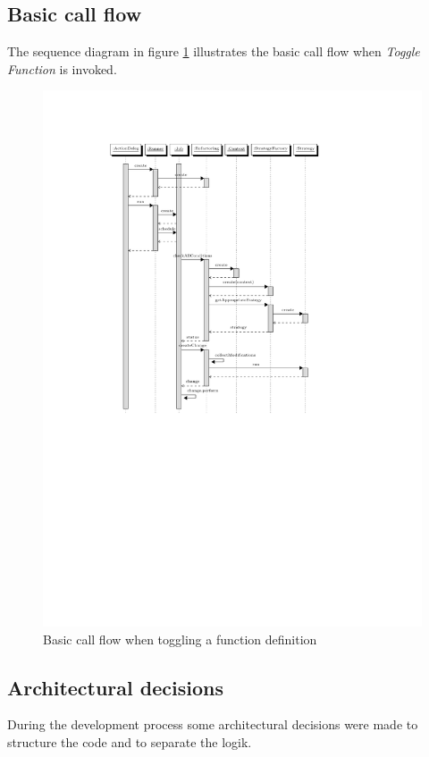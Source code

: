 \subsection{Basic call flow}
The sequence diagram in figure \ref{sd} illustrates the basic call flow when 
\textit{Toggle Function} is invoked.
\begin{figure}[h]
  \centering
  \includegraphics[trim = 35mm 120mm 40mm 28mm,clip,scale=0.8]{seqdiagram/seqdiagram.pdf} %
  \caption{Basic call flow when toggling a function definition}
  \label{sd}
\end{figure}

\subsection{Architectural decisions}

During the development process some architectural decisions were made to
structure the code and to separate the logik.

